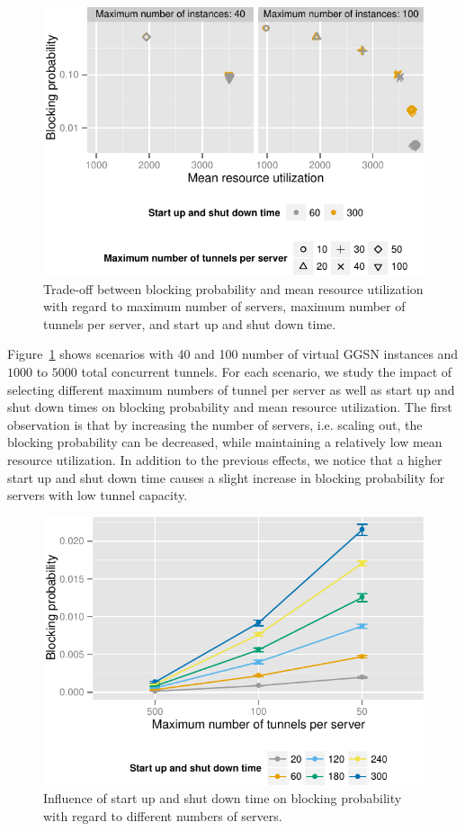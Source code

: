 \begin{figure}[htb]
  \centering
  \includegraphics{images/compare-util-block.pdf}
  \caption{Trade-off between blocking probability and mean resource utilization with regard to maximum number of servers, maximum number of tunnels per server, and start up and shut down time.}
 \label{c4:fig:compare_util_block}
\end{figure}

Figure~\ref{c4:fig:compare_util_block} shows scenarios with 40 and 100 number of virtual \gls{GGSN} instances and  $1000$ to $5000$ total concurrent tunnels. For each scenario, we study the impact of selecting different maximum numbers of tunnel per server as well as start up and shut down times on blocking probability and mean resource utilization. The first observation is that by increasing the number of servers, i.e. scaling out, the blocking probability can be decreased, while maintaining a relatively low mean resource utilization. In addition to the previous effects, we notice that a higher start up and shut down time causes a slight increase in blocking probability for servers with low tunnel capacity.

\begin{figure}[htbp]
  \centering
  \includegraphics{images/compare-maxinstances-block.pdf}
  \caption{Influence of start up and shut down time on blocking probability with regard to different numbers of servers.}
 \label{c4:fig:compare_maxinstances_block}
\end{figure}

